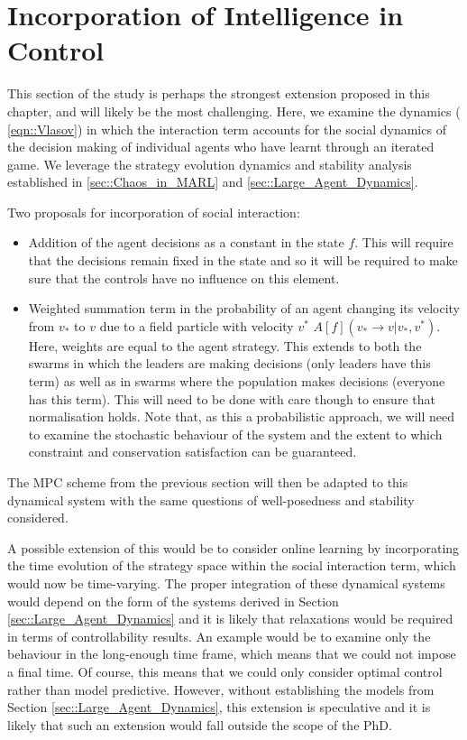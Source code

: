 \documentclass[.../main.tex]{subfiles}
\begin{document}
    \section{Incorporation of Intelligence in Control} \label{sec::Intelligence_in_control}

    This section of the study is perhaps the strongest extension proposed in this
	chapter, and will likely be the most challenging. Here, we examine the dynamics (
	\ref{eqn::Vlasov}) in which the interaction term accounts for the social dynamics of the
	decision making of individual agents who have learnt through an iterated game. We leverage the
	strategy evolution dynamics and stability analysis established in 
	\ref{sec::Chaos_in_MARL} and \ref{sec::Large_Agent_Dynamics}. 

	Two proposals for incorporation of social interaction:
	\begin{itemize}
		\item Addition of the agent decisions as a constant in the state $f$. This will require that
		the decisions remain fixed in the state and so it will be required to make sure that the
		controls have no influence on this element.
		\item Weighted summation term in the probability of an agent changing its velocity from
		$v_*$ to
		$v$ due to a field particle with velocity $v^*$ $A[f](v_* \rightarrow v | v_*, v^*)$.
		Here, weights are equal to the agent strategy. This extends to both the swarms in
		which the leaders are making decisions (only leaders have this term) as well as in
		swarms where the population makes decisions (everyone has this term). This will need to be
		done with care though to ensure that normalisation holds. Note that, as this a probabilistic
		approach, we will need to examine the stochastic behaviour of the system and the extent to
		which constraint and conservation satisfaction can be guaranteed.
	\end{itemize}

	The MPC scheme from the previous section will then be adapted to this dynamical system with the
	same questions of well-posedness and stability considered. 

	A possible extension of this would be to consider online learning by incorporating the time
	evolution of the strategy space within the social interaction term, which would now be
	time-varying. The proper integration of these dynamical systems would depend on the form of the
	systems derived in Section \ref{sec::Large_Agent_Dynamics} and it is likely that relaxations would
	be required in terms of controllability results. An example would be to examine only the
	behaviour in the long-enough time frame, which means that we could not impose a final time. Of
	course, this means that we could only consider optimal control rather than model predictive.
	However, without establishing the models from Section \ref{sec::Large_Agent_Dynamics}, this
	extension is speculative and it is likely that such an extension would fall outside the scope of
	the PhD.

\end{document}
